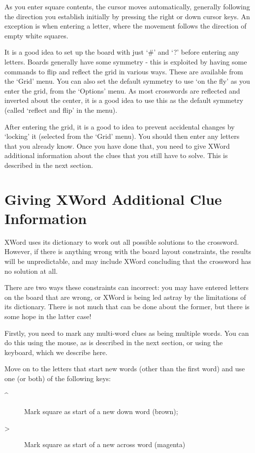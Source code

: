 As you enter square contents, the cursor moves automatically,
generally following the direction you establish initially
by pressing the right or down cursor keys. An exception is 
when entering a letter, where the movement follows the direction
of empty white squares.

It is a good idea to set up the board with just `#' and `?' before
entering any letters. Boards generally have some symmetry - this
is exploited by having some commands to flip and reflect the 
grid in various ways. These are available from the `Grid' menu.
You can also set the default symmetry to use `on the fly' as you
enter the grid, from the `Options' menu. As most crosswords are
reflected and inverted about the center, it is a good idea to use
this as the default symmetry (called `reflect and flip' in the
menu).

After entering the grid, it is a good to idea to prevent accidental
changes by `locking' it (selected from the `Grid' menu). You should
then enter any letters that you already know. Once you have done
that, you need to give XWord additional information about the clues
that you still have to solve. This is described in the next section.


\section{Giving XWord Additional Clue Information}

XWord uses its dictionary to work out all possible solutions to the
crossword. However, if there is anything wrong with the board layout
constraints, the results will be unpredictable, and may include
XWord concluding that the crossword has no solution at all.

There are two ways these constraints can incorrect: you may have
entered letters on the board that are wrong, or XWord is being led
astray by the limitations of its dictionary. There is not much that 
can be done about the former, but there is some hope in the latter
case!

Firstly, you need to mark any multi-word clues as being multiple words.
You can do this using the mouse, as is described in the next section,
or using the keyboard, which we describe here.

Move on to the letters that start new words (other than the first
word) and use one (or both) of the following keys:

\begin{description}
\item [^] Mark square as start of a new down word (brown);
\item [>] Mark square as start of a new across word (magenta)
\end{description}

